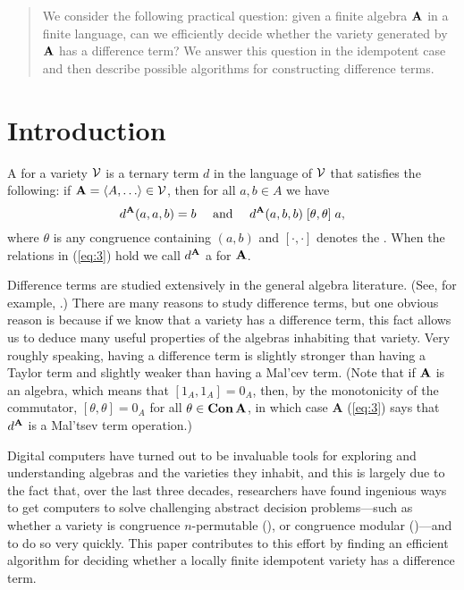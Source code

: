 \begin{abstract}
We consider the following practical question: given a finite 
algebra $\mathbf{A}$ in a
finite language, can we efficiently decide whether the variety 
generated by $\mathbf{A}$
has a difference term?  We answer this question in the idempotent case
and then describe possible algorithms for constructing difference terms.
\end{abstract}

\section{Introduction}
\label{sec:introduction}

A  for a variety $\mathcal{V}$ is a ternary term $d$ in the
language of $\mathcal{V}$ that satisfies the following:
if $\alg{A} = \<A, \dots \> \in \sV$, then for all $a, b \in A$ we have
\begin{equation}
\label{eq:3}  
d^{\mathbf{A}}(a,a,b) = b \quad \text{ and } \quad
d^{\mathbf{A}}(a,b,b) \mathrel{[\theta, \theta]} a,
\end{equation}
where $\theta$ is any congruence %
containing $(a,b)$
and $[\cdot, \cdot]$ denotes the .
When the relations in (\ref{eq:3}) hold we call $d^{\mathbf{A}}$
a  for $\mathbf{A}$.

Difference terms are studied extensively in the general algebra literature.
(See, for example, \cite{MR1358491,MR1663558,MR3076179,KSW,MR3449235}.)
There are many reasons to study difference terms, but
one obvious reason is because if we know that a variety 
has a difference term, this fact allows us to deduce many useful
properties of the algebras inhabiting that variety.
Very roughly speaking, having a difference term is slightly stronger than having
a Taylor term and slightly weaker than having a Mal'cev term.
(Note that if
$\mathbf{A}$ is an  algebra, which means 
that $[1_A, 1_A] = 0_A$, then, by
the monotonicity of the commutator,
$[\theta, \theta] = 0_A$ for all $\theta \in \operatorname{\mathbf{Con}} \mathbf{A}$, 
in which case $\textbf{A}$
(\ref{eq:3}) says that $d^{\mathbf{A}}$ is a Mal'tsev term operation.)

Digital computers have turned out to be invaluable tools for exploring and
understanding algebras and the varieties they inhabit, and this is largely due
to the fact that, over the last three decades,
researchers have found ingenious ways to get computers to
solve challenging abstract decision problems---such as whether a variety is
congruence $n$-permutable (\cite{MR3239624}), or
congruence modular (\cite{Freese:2009})---and to do so very quickly.
This paper contributes to this effort by finding an efficient
algorithm for deciding whether a locally finite idempotent variety has a
difference term.

